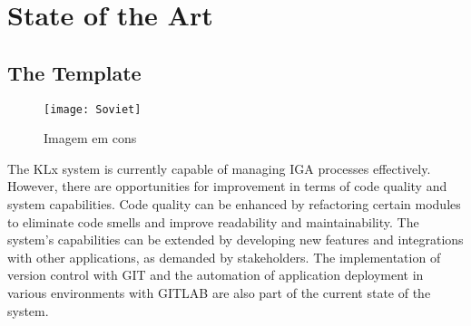 
%

\chapter{State of the Art}
\label{cha:State of the Art}



\section{The Template}
\label{sec:a_bit_of_history}

\begin{figure}[htbp]
  \centering
  \texttt{[image: Soviet]}
  \caption{Imagem em cons}
  \label{fig:Figuras_Tree_silhouettes-bitmap}
\end{figure}

The KLx system is currently capable of managing IGA processes effectively. However, there are opportunities for improvement in terms of code quality and system capabilities. Code quality can be enhanced by refactoring certain modules to eliminate code smells and improve readability and maintainability. The system’s capabilities can be extended by developing new features and integrations with other applications, as demanded by stakeholders. The implementation of version control with GIT and the automation of application deployment in various environments with GITLAB are also part of the current state of the system.